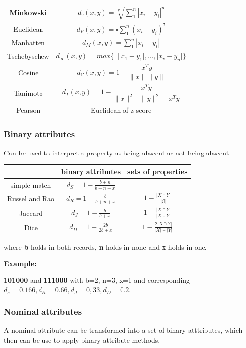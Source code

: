 \documentclass[fleqn, oneside, 10pt, titlepage]{article}
\begin{document}
\begin{tabular}{|c|c|}
\hline 
Minkowski & $d_p(x,y) = \sqrt[p]{\sum_1^n|x_i - y_i|^p}$ \\ 
\hline 
Euclidean & $d_E(x,y) = \square{\sum_1^n (x_i - y_i)^2}$ \\ 
\hline 
Manhatten & $d_M(x,y) = \sum_1^n |x_i - y_i|$ \\ 
\hline 
Tschebyschew & $d_\infty(x,y) = max\{\|x_1 - y_1|, ..., |x_n - y_n| \}$ \\ 
\hline 
Cosine & $d_C(x,y) = 1 - \dfrac{x^Ty}{\parallel x \parallel \parallel y \parallel}$ \\ 
\hline 
Tanimoto & $d_T(x,y) = 1 - \dfrac{x^Ty}{\parallel x \parallel^2 + \parallel y \parallel^2 - x^Ty}$ \\ 
\hline 
Pearson & Euclidean of z-score \\ 
\hline 
\end{tabular} 

\subsubsection{Binary attributes}
Can be used to interpret a property as being abscent or not being abscent.

\begin{tabular}{|c|c|c|}
\hline 
 & binary attributes & sets of properties \\ 
\hline 
simple match & $d_S = 1 - \frac{b+n}{b+n+x}$ & \\ 
\hline 
Russel and Rao & $d_R = 1 - \frac{b}{b+n+x}$ & $1 - \frac{|X \cap Y|}{ |\Omega|}$ \\ 
\hline 
Jaccard & $d_J = 1 - \frac{b}{b+x}$ & $1 - \frac{|X \cap Y|}{ |X \cup Y|}$ \\ 
\hline 
Dice & $d_D = 1 - \frac{2b}{2b+x}$ &  $1 - \frac{2|X \cap Y|}{ |X| + |Y|}$ \\ 
\hline 
\end{tabular}

where \textbf{b} holds in both records, \textbf{n} holds in none and \textbf{x} holds in one.

\textbf{Example:}

\textbf{101000} and \textbf{111000} with b=2, n=3, x=1 and corresponding $d_s = 0.166, d_R = 0.66, d_J = 0,33, d_D = 0.2$.

\subsubsection{Nominal attributes}
A nominal attribute can be transformed into a set of binary atttributes, which then can be use to apply binary attribute methods.
\end{document}
